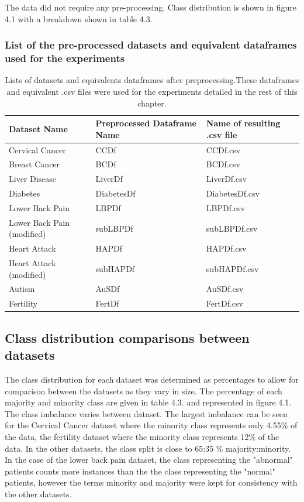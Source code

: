 The data did not require any pre-processing. Class distribution is shown in figure 4.1 with a breakdown shown in table 4.3.\newline


\subsubsection{List of the pre-processed datasets and equivalent dataframes used for the experiments}

\begin{table}[!htbp]
\centering
\begin{tabular}{p{3cm}p{3.5cm}p{3cm}}
  \hline
  \rowcolor{LightCyan}
Dataset Name & Preprocessed Dataframe Name & Name of resulting .csv file\\ 
  \hline
   Cervical Cancer & CCDf & CCDf.csv \\ 
   Breast Cancer & BCDf & BCDf.csv \\ 
   Liver Disease & LiverDf & LiverDf.csv \\ 
   Diabetes & DiabetesDf & DiabetesDf.csv \\ 
   Lower Back Pain & LBPDf &  LBPDf.csv\\ 
   Lower Back Pain (modified) & subLBPDf & subLBPDf.csv \\ 
   Heart Attack & HAPDf & HAPDf.csv \\ 
   Heart Attack (modified) & subHAPDf & subHAPDf.csv \\ 
   Autism & AuSDf & AuSDf.csv \\ 
   Fertility & FertDf & FertDf.csv \\ 
   \hline
\end{tabular}
\caption{Lists of datasets and equivalents dataframes after preprocessing.These dataframes and equivalent .csv files were used for the experiments detailed in the rest of this chapter.}
\label{tab:datasetsAndFrames}
\end{table}

\subsection{Class distribution comparisons between datasets}
The class distribution for each dataset was determined as percentages to allow for comparison between the datasets as they vary in size. 
The percentage of each majority and minority class are given in table 4.3. and represented in figure 4.1.\newline
The class imbalance varies between dataset. The largest imbalance can be seen for the Cervical Cancer dataset where the minority class represents only 4.55\% of the data, the fertility dataset where the minority class represents 12\% of the data. In the other datasets, the class split is close to 65:35 \% majority:minority.\newline
In the case of the lower back pain dataset, the class representing the "abnormal" patients counts more instances than the the class representing the "normal" patients, however the terms minority and majority were kept for consistency with the other datasets.\newline


